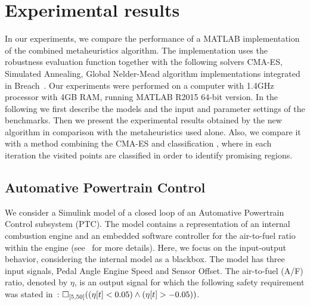\section{Experimental results}

In our experiments, we compare the performance of a MATLAB
implementation of the combined metaheuristics algorithm. The implementation uses
the robustness evaluation function together with the following solvers CMA-ES, Simulated Annealing, Global
Nelder-Mead algorithm implementations integrated in
Breach~\cite{DBLP:conf/cav/Donze10}. 
Our experiments were performed on a computer with 1.4GHz processor with 4GB RAM, running 
MATLAB R2015 64-bit version. 
In the following we first describe the models and the input and parameter settings of the benchmarks. Then we present the experimental results obtained by the new algorithm in comparison with the metaheuristics used alone. Also, we compare it with a method combining
the CMA-ES and classification \cite{CAV2017}, where in each iteration the visited points are classified in order to identify promising regions.


\subsection{Automative Powertrain Control} \label{sec:PTC}
We consider a Simulink model of a closed loop of an Automative Powertrain Control
subsystem (PTC). The model contains a representation of an internal combustion engine and an
embedded software controller for the air-to-fuel ratio within the
engine (see~\cite{Dreossi2015} for more details). Here, we
focus on the input-output behavior, considering the
internal model as a blackbox. The model has three input signals,
Pedal Angle Engine Speed and Sensor Offset.
The air-to-fuel (A/F) ratio, denoted by $\eta$, is an
output signal for which the following safety requirement was stated
in~\cite{Dreossi2015}: %
$\Box_{[5,50]}( (\eta[t] < 0.05) \land ( \eta[t] > - 0.05 ))$.

